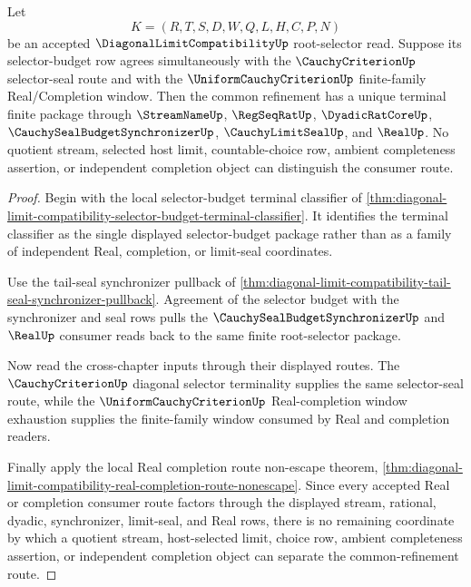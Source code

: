 \begin{theorem}
\label{thm:diagonal-limit-selector-budget-common-refinement-terminality}
Let
$$
K=(R,T,S,D,W,Q,L,H,C,P,N)
$$
be an accepted $\DiagonalLimitCompatibilityUp$ root-selector read. Suppose its selector-budget row agrees simultaneously with the $\CauchyCriterionUp$ selector-seal route and with the $\UniformCauchyCriterionUp$ finite-family Real/Completion window. Then the common refinement has a unique terminal finite package through $\StreamNameUp$, $\RegSeqRatUp$, $\DyadicRatCoreUp$, $\CauchySealBudgetSynchronizerUp$, $\CauchyLimitSealUp$, and $\RealUp$. No quotient stream, selected host limit, countable-choice row, ambient completeness assertion, or independent completion object can distinguish the consumer route.
\end{theorem}
\begin{proof}
Begin with the local selector-budget terminal classifier of \autoref{thm:diagonal-limit-compatibility-selector-budget-terminal-classifier}. It identifies the terminal classifier as the single displayed selector-budget package rather than as a family of independent Real, completion, or limit-seal coordinates.

Use the tail-seal synchronizer pullback of \autoref{thm:diagonal-limit-compatibility-tail-seal-synchronizer-pullback}. Agreement of the selector budget with the synchronizer and seal rows pulls the $\CauchySealBudgetSynchronizerUp$ and $\RealUp$ consumer reads back to the same finite root-selector package.

Now read the cross-chapter inputs through their displayed routes. The $\CauchyCriterionUp$ diagonal selector terminality supplies the same selector-seal route, while the $\UniformCauchyCriterionUp$ Real-completion window exhaustion supplies the finite-family window consumed by Real and completion readers.

Finally apply the local Real completion route non-escape theorem, \autoref{thm:diagonal-limit-compatibility-real-completion-route-nonescape}. Since every accepted Real or completion consumer route factors through the displayed stream, rational, dyadic, synchronizer, limit-seal, and Real rows, there is no remaining coordinate by which a quotient stream, host-selected limit, choice row, ambient completeness assertion, or independent completion object can separate the common-refinement route.
\end{proof}

